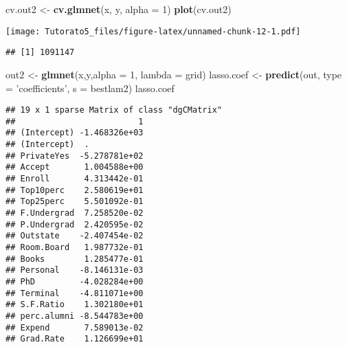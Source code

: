 \documentclass[
]{article}
\newenvironment{Shaded}{\begin{snugshade}}{\end{snugshade}}
\newcommand{\DataTypeTok}[1]{\textcolor[rgb]{0.13,0.29,0.53}{#1}}
\newcommand{\DecValTok}[1]{\textcolor[rgb]{0.00,0.00,0.81}{#1}}
\newcommand{\KeywordTok}[1]{\textcolor[rgb]{0.13,0.29,0.53}{\textbf{#1}}}
\newcommand{\NormalTok}[1]{#1}
\newcommand{\OperatorTok}[1]{\textcolor[rgb]{0.81,0.36,0.00}{\textbf{#1}}}
\newcommand{\StringTok}[1]{\textcolor[rgb]{0.31,0.60,0.02}{#1}}
\begin{document}
\begin{Shaded}
\begin{Highlighting}[]
\NormalTok{cv.out2 <-}\StringTok{ }\KeywordTok{cv.glmnet}\NormalTok{(x, y, }\DataTypeTok{alpha =} \DecValTok{1}\NormalTok{)}
\KeywordTok{plot}\NormalTok{(cv.out2)}
\end{Highlighting}
\end{Shaded}

\texttt{[image: Tutorato5\_files/figure-latex/unnamed-chunk-12-1.pdf]}

\begin{Shaded}
\end{Shaded}

\begin{verbatim}
## [1] 1091147
\end{verbatim}

\begin{Shaded}
\begin{Highlighting}[]
\NormalTok{out2 <-}\StringTok{  }\KeywordTok{glmnet}\NormalTok{(x,y,}\DataTypeTok{alpha =} \DecValTok{1}\NormalTok{, }\DataTypeTok{lambda =}\NormalTok{ grid)}
\NormalTok{lasso.coef <-}\StringTok{  }\KeywordTok{predict}\NormalTok{(out, }\DataTypeTok{type =} \StringTok{'coefficients'}\NormalTok{, }\DataTypeTok{s =}\NormalTok{ bestlam2)}
\NormalTok{lasso.coef}
\end{Highlighting}
\end{Shaded}

\begin{verbatim}
## 19 x 1 sparse Matrix of class "dgCMatrix"
##                         1
## (Intercept) -1.468326e+03
## (Intercept)  .           
## PrivateYes  -5.278781e+02
## Accept       1.004588e+00
## Enroll       4.313442e-01
## Top10perc    2.580619e+01
## Top25perc    5.501092e-01
## F.Undergrad  7.258520e-02
## P.Undergrad  2.420595e-02
## Outstate    -2.407454e-02
## Room.Board   1.987732e-01
## Books        1.285477e-01
## Personal    -8.146131e-03
## PhD         -4.028284e+00
## Terminal    -4.811071e+00
## S.F.Ratio    1.302180e+01
## perc.alumni -8.544783e+00
## Expend       7.589013e-02
## Grad.Rate    1.126699e+01
\end{verbatim}
\end{document}
